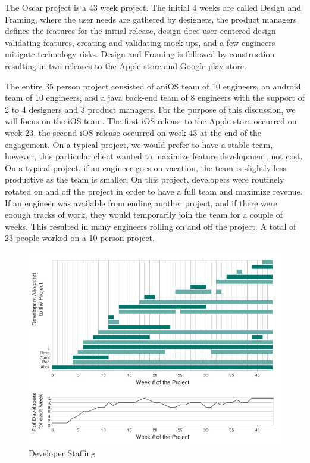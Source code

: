 The Oscar project is a 43 week project. The initial 4 weeks are called Design and Framing, where the user needs are gathered by designers, the product managers defines the features for the initial release, design does user-centered design validating features, creating and validating mock-ups, and a few engineers mitigate technology risks. Design and Framing is followed by construction resulting in two releases to the Apple store and Google play store.

The entire 35 person project consisted of aniOS team of 10 engineers, an android team of 10 engineers, and a java back-end team of 8 engineers with the support of 2 to 4 designers and 3 product managers. For the purpose of this discussion, we will focus on the iOS team. The first iOS release to the Apple store occurred on week 23, the second iOS release occurred on week 43 at the end of the engagement. On a typical project, we would prefer to have a stable team, however, this particular client wanted to maximize feature development, not cost. On a typical project, if an engineer goes on vacation, the team is slightly less productive as the team is smaller. On this project, developers were routinely rotated on and off the project in order to have a full team and maximize revenue. If an engineer was available from ending another project, and if there were enough tracks of work, they would temporarily join the team for a couple of weeks. This resulted in many engineers rolling on and off the project. A total of 23 people worked on a 10 person project.

\begin{figure}[t]
\centering
\includegraphics[width=7.1in]{DeveloperStaffing.jpg}
\caption{Developer Staffing}
\label{DeveloperStaffing}
\end{figure}

